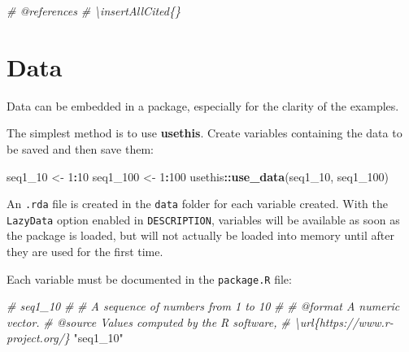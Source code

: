 \documentclass[
  12pt,
  american,
  a4paper,
  extrafontsizes,onecolumn,openright
  ]{memoir}
\newenvironment{Shaded}{\begin{snugshade}}{\end{snugshade}}
\newcommand{\CommentTok}[1]{\textcolor[rgb]{0.56,0.35,0.01}{\textit{#1}}}
\newcommand{\DecValTok}[1]{\textcolor[rgb]{0.00,0.00,0.81}{#1}}
\newcommand{\FunctionTok}[1]{\textcolor[rgb]{0.13,0.29,0.53}{\textbf{#1}}}
\newcommand{\NormalTok}[1]{#1}
\newcommand{\OtherTok}[1]{\textcolor[rgb]{0.56,0.35,0.01}{#1}}
\newcommand{\SpecialCharTok}[1]{\textcolor[rgb]{0.81,0.36,0.00}{\textbf{#1}}}
\newcommand{\StringTok}[1]{\textcolor[rgb]{0.31,0.60,0.02}{#1}}
\begin{document}
\scriptsize

\begin{Shaded}
\begin{Highlighting}[]
\CommentTok{\#\textquotesingle{} @references}
\CommentTok{\#\textquotesingle{} \textbackslash{}insertAllCited\{\}}
\end{Highlighting}
\end{Shaded}

\normalsize

\section{Data}\label{data}

Data can be embedded in a package, especially for the clarity of the examples.

The simplest method is to use \textbf{usethis}.
Create variables containing the data to be saved and then save them:

\scriptsize

\begin{Shaded}
\begin{Highlighting}[]
\NormalTok{seq1\_10 }\OtherTok{\textless{}{-}} \DecValTok{1}\SpecialCharTok{:}\DecValTok{10}
\NormalTok{seq1\_100 }\OtherTok{\textless{}{-}} \DecValTok{1}\SpecialCharTok{:}\DecValTok{100}
\NormalTok{usethis}\SpecialCharTok{::}\FunctionTok{use\_data}\NormalTok{(seq1\_10, seq1\_100)}
\end{Highlighting}
\end{Shaded}

\normalsize

An \texttt{.rda} file is created in the \texttt{data} folder for each variable created.
With the \texttt{LazyData} option enabled in \texttt{DESCRIPTION}, variables will be available as soon as the package is loaded, but will not actually be loaded into memory until after they are used for the first time.

Each variable must be documented in the \texttt{package.R} file:

\scriptsize

\begin{Shaded}
\begin{Highlighting}[]
\CommentTok{\#\textquotesingle{} seq1\_10}
\CommentTok{\#\textquotesingle{}}
\CommentTok{\#\textquotesingle{} A sequence of numbers from 1 to 10}
\CommentTok{\#\textquotesingle{}}
\CommentTok{\#\textquotesingle{} @format A numeric vector.}
\CommentTok{\#\textquotesingle{} @source Values computed by the R software, }
\CommentTok{\#\textquotesingle{}   \textbackslash{}url\{https://www.r{-}project.org/\}}
\StringTok{"seq1\_10"}
\end{Highlighting}
\end{Shaded}
\end{document}
